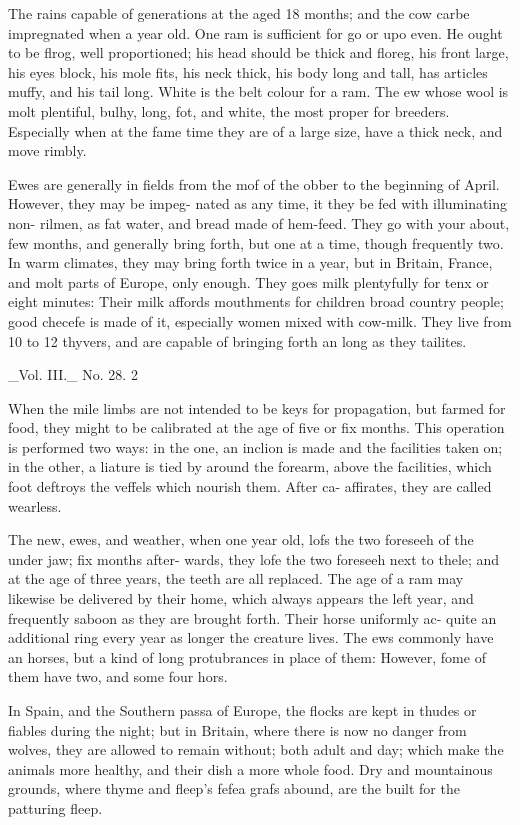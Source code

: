 The rains capable of generations at the aged 18 months; and the cow carbe impregnated when a year old. One ram is sufficient for go or upo even. He ought to be flrog, well proportioned; his head should be thick and floreg, his front large, his eyes block, his mole fits, his neck thick, his body long and tall, has articles muffy, and his tail long. White is the belt colour for a ram. The ew whose wool is molt plentiful, bulhy, long, fot, and white, the most proper for breeders. Especially when at the fame time they are of a large size, have a thick neck, and move rimbly.\par\medskip
Ewes are generally in fields from the mof of the obber to the beginning of April. However, they may be impeg- nated as any time, it they be fed with illuminating non- rilmen, as fat water, and bread made of hem-feed. They go with your about, few months, and generally bring forth, but one at a time, though frequently two. In warm climates, they may bring forth twice in a year, but in Britain, France, and molt parts of Europe, only enough. They goes milk plentyfully for tenx or eight minutes: Their milk affords mouthments for children broad country people; good checefe is made of it, especially women mixed with cow-milk. They live from 10 to 12 thyvers, and are capable of bringing forth an long as they tailites.\par\medskip
\_Vol. III.\_ No. 28. 2\par\medskip
When the mile limbs are not intended to be keys for propagation, but farmed for food, they might to be calibrated at the age of five or fix months. This operation is performed two ways: in the one, an inclion is made and the facilities taken on; in the other, a liature is tied by around the forearm, above the facilities, which foot deftroys the veffels which nourish them. After ca- affirates, they are called wearless.\par\medskip
The new, ewes, and weather, when one year old, lofs the two foreseeh of the under jaw; fix months after- wards, they lofe the two foreseeh next to thele; and at the age of three years, the teeth are all replaced. The age of a ram may likewise be delivered by their home, which always appears the left year, and frequently saboon as they are brought forth. Their horse uniformly ac- quite an additional ring every year as longer the creature lives. The ews commonly have an horses, but a kind of long protubrances in place of them: However, fome of them have two, and some four hors.\par\medskip
In Spain, and the Southern passa of Europe, the flocks are kept in thudes or fiables during the night; but in Britain, where there is now no danger from wolves, they are allowed to remain without; both adult and day; which make the animals more healthy, and their dish a more whole food. Dry and mountainous grounds, where thyme and fleep's fefea grafs abound, are the built for the patturing fleep.\par\medskip

